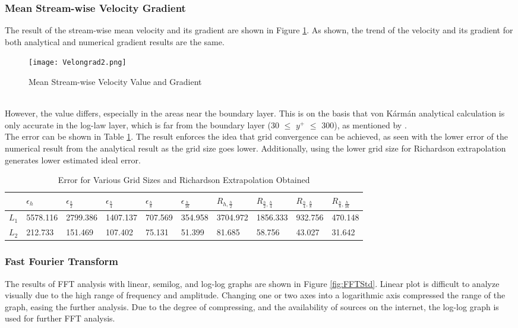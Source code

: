 \documentclass[11pt]{article}
\begin{document}
\subsubsection{Mean Stream-wise Velocity Gradient}
The result of the stream-wise mean velocity and its gradient are shown in Figure \ref{fig:VelonGrad}. As shown, the trend of the velocity and its gradient for both analytical and numerical gradient results are the same. 
\begin{figure}[ht]
    \centering
    \texttt{[image: Velongrad2.png]}
    \caption{Mean Stream-wise Velocity Value and Gradient}
    \label{fig:VelonGrad}
\end{figure}
\\
\noindent However, the value differs, especially in the areas near the boundary layer. This is on the basis that von Kármán analytical calculation is only accurate in the log-law layer, which is far from the boundary layer (30 $\leq$ $y^+$ $\leq$ 300), as mentioned by \citet{Arnau2023}.\\
\newline
\noindent The error can be shown in Table \ref{tab: error}. The result enforces the idea that grid convergence can be achieved, as seen with the lower error of the numerical result from the analytical result as the grid size goes lower. Additionally, using the lower grid size for Richardson extrapolation generates lower estimated ideal error.
\newpage
\begin{table}[ht]
\centering
\caption{Error for Various Grid Sizes and Richardson Extrapolation Obtained}
\label{tab: error}
\begin{tabular}{llllllllll}
\cline{2-10}
 & \textbf{$\epsilon_{h}$} & \textbf{$\epsilon_{\frac{h}{2}}$} & \textbf{$\epsilon_{\frac{h}{4}}$} & \textbf{$\epsilon_{\frac{h}{8}}$} & \textbf{$\epsilon_{\frac{h}{16}}$} & \textbf{$R_{h, \frac{h}{2}}$} & \textbf{$R_{\frac{h}{2}, \frac{h}{4}}$} & \textbf{$R_{\frac{h}{4}, \frac{h}{8}}$} & \textbf{$R_{\frac{h}{8}, \frac{h}{16}}$} \\ \hline
\textbf{$L_1$} & 5578.116 & 2799.386 & 1407.137 & 707.569 & 354.958 & 3704.972 & 1856.333 & 932.756 & 470.148 \\
\textbf{$L_2$} & 212.733 & 151.469 & 107.402 & 75.131 & 51.399 & 81.685 & 58.756 & 43.027 & 31.642 \\ \hline
\end{tabular}
\end{table}


\subsubsection{Fast Fourier Transform}
The results of FFT analysis with linear, semilog, and log-log graphs are shown in Figure \ref{fig:FFTStd}. Linear plot is difficult to analyze visually due to the high range of frequency and amplitude. Changing one or two axes into a logarithmic axis compressed the range of the graph, easing the further analysis. Due to the degree of compressing, and the availability of sources on the internet, the log-log graph is used for further FFT analysis.
\end{document}
